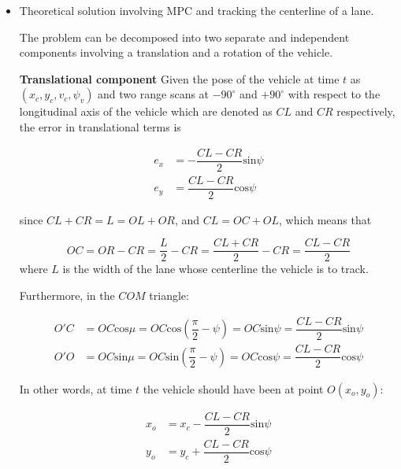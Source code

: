 \documentclass[oneside,12pt]{article}
\begin{document}
\begin{itemize}
  \item Theoretical solution involving MPC and tracking the centerline of a lane.

    The problem can be decomposed into two separate and independent
    components involving a translation and a rotation of the vehicle.


    \textbf{Translational component} Given the pose of the vehicle at time $t$
    as $(x_c, y_c, v_c, \psi_v)$ and two range scans at $-90^\circ$ and
    $+90^\circ$ with respect to the longitudinal axis of the vehicle which are
    denoted as $CL$ and $CR$ respectively, the error in translational terms is

    \begin{align}
      e_x &= -\dfrac{CL-CR}{2}\text{sin}\psi \\
      e_y &= \dfrac{CL-CR}{2}\text{cos}\psi
    \end{align}

    since $CL + CR = L = OL + OR$, and $CL = OC + OL$, which means that

    \begin{equation}
      OC = OR - CR = \dfrac{L}{2} - CR = \dfrac{CL + CR}{2} - CR = \dfrac{CL-CR}{2}
    \end{equation}
    where $L$ is the width of the lane whose centerline the vehicle is to track.

    Furthermore, in the $COM$ triangle:

    \begin{align}
      O'C &= OC \text{cos}\mu = OC \text{cos}(\dfrac{\pi}{2} - \psi) = OC \text{sin}\psi = \dfrac{CL-CR}{2} \text{sin}\psi\\
      O'O &= OC \text{sin}\mu = OC \text{sin}(\dfrac{\pi}{2} - \psi) = OC \text{cos}\psi = \dfrac{CL-CR}{2} \text{cos}\psi
    \end{align}

    In other words, at time $t$ the vehicle should have been at point $O(x_o, y_o)$:

    \begin{align}
      x_o &=x_c - \dfrac{CL-CR}{2}\text{sin}\psi \\
      y_o &=y_c + \dfrac{CL-CR}{2}\text{cos}\psi
    \end{align}

    \begin{figure}[H]\centering
      \scalebox{1}{}
      \caption{}
      \label{}
    \end{figure}


\end{itemize}
\end{document}
